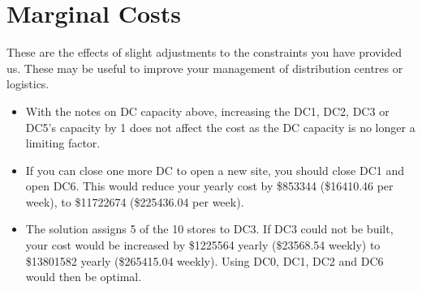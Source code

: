 \documentclass[11pt,a4paper]{article}
\begin{document}
\section{Marginal Costs}
These are the effects of slight adjustments to the constraints 
you have provided us. These may be useful to improve your management of 
 distribution centres or logistics. 
\begin{itemize}
    \item With the notes on DC capacity above, increasing the DC1, DC2, DC3 or DC5's
    capacity by 1 does not affect the cost as the DC capacity is no longer a 
    limiting factor.
    \item If you can close one more DC to open a new site, you should close 
    DC1 and open DC6. This would reduce your yearly cost by \$853344 (\$16410.46 per week),
    to \$11722674 (\$225436.04 per week).
    \item The solution assigns 5 of the 10 stores to DC3. If DC3 could not be built, 
    your cost would be increased by \$1225564 yearly (\$23568.54 weekly) 
    to \$13801582 yearly (\$265415.04 weekly). Using DC0, DC1, DC2 and DC6 would 
    then be optimal.
\end{itemize}
\end{document}
